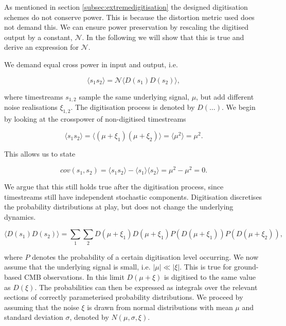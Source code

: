 \documentclass[apj]{emulateapj}
\begin{document}
As mentioned in section \ref{subsec:extremedigitisation} the designed digitisation schemes do not conserve power. This is because the distortion metric used does not demand this. We can ensure power preservation by rescaling the digitised output by a constant, $\mathcal{N}$. In the following we will show that this is true and derive an expression for $\mathcal{N}$.

We demand equal cross power in input and output, i.e.

\begin{equation} \label{eq:normcrosspower}
\langle s_1 s_2 \rangle = \mathcal{N} \langle D(s_1) D(s_2) \rangle,
\end{equation}

where timestreams $s_{1,2}$ sample the same underlying signal, $\mu$, but add different noise realisations $\xi_{1, 2}$. The digitisation process is denoted by $D(\dots)$. We begin by looking at the crosspower of non-digitised timestreams

\begin{equation}
\langle s_1 s_2 \rangle = \langle (\mu + \xi_1) (\mu + \xi_2) \rangle =  \langle \mu^2 \rangle = \mu^2.
\end{equation}

This allows us to state

\begin{equation}
cov(s_1, s_2) = \langle s_1 s_2 \rangle - \langle s_1 \rangle \langle s_2 \rangle = \mu^2 - \mu^2 = 0.
\end{equation}

We argue that this still holds true after the digitisation process, since timestreams still have independent stochastic components. Digitisation discretises the probability distributions at play, but does not change the underlying dynamics.

\begin{equation}
\langle D(s_1) D(s_2) \rangle = \sum_1 \sum_2 D(\mu + \xi_1) D(\mu + \xi_1) P(D(\mu + \xi_1)) P(D(\mu + \xi_2)),
\end{equation}

where $P$ denotes the probability of a certain digitisation level occurring. We now assume that the underlying signal is small, i.e. $| \mu | \ll | \xi |$. This is true for ground-based CMB observations. In this limit $D(\mu + \xi)$ is digitised to the same value as $D(\xi)$. The probabilities can then be expressed as integrals over the relevant sections of correctly parameterised probability distributions. We proceed by assuming that the noise $\xi$ is drawn from normal distributions with mean $\mu$ and standard deviation $\sigma$, denoted by $N(\mu, \sigma, \xi)$.
\end{document}
